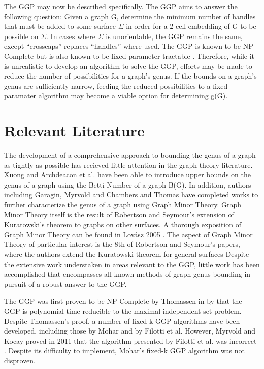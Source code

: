 \documentclass[12pt,conference]{IEEEtran}
\begin{document}
The GGP may now be described specifically. The GGP aims to answer the following question: Given a graph G, determine the minimum number of handles that must be added to some surface $\Sigma$ in order for a 2-cell embedding of G to be possible on $\Sigma$. In cases where $\Sigma$ is unorientable, the GGP remains the same, except ``crosscaps'' replaces ``handles'' where used. The GGP is known to be NP-Complete \cite{thomassen} but is also known to be fixed-parameter tractable \cite{mohar}. Therefore, while it is unrealistic to develop an algorithm to solve the GGP, efforts may be made to reduce the number of possibilities for a graph's genus. If the bounds on a graph's genus are sufficiently narrow, feeding the reduced possibilities to a fixed-paramater algorithm may become a viable option for determining g(G).

\section{Relevant Literature}

The development of a comprehensive approach to bounding the genus of a graph as tightly as possible has recieved little attention in the graph theory literature. Xuong \cite{xuong} and Archdeacon et al. \cite{archdeacon} have been able to introduce upper bounds on the genus of a graph using the Betti Number of a graph B(G). In addition, authors including Garagin, Myrvold and Chambers \cite{gagarin-myrvold} and Thomas \cite{thomas} have completed works to further characterize the genus of a graph using Graph Minor Theory. Graph Minor Theory itself is the result of Robertson and Seymour's extension of Kuratowski's theorem to graphs on other surfaces. A thorough exposition of Graph Minor Theory can be found in Lov\'asz 2005 \cite{lovasz}. The aspect of Graph Minor Theory of particular interest is the 8th of Robertson and Seymour's papers, where the authors extend the Kuratowski theorem for general surfaces \cite{graph-minors-8} Despite the extensive work understaken in areas relevant to the GGP, little work has been accomplished that encompasses all known methods of graph genus bounding in pursuit of a robust answer to the GGP. 

The GGP was first proven to be NP-Complete by Thomassen in \cite{thomassen} by that the GGP is polynomial time reducible to the maximal independent set problem. Despite Thomassen's proof, a number of fixed-k GGP algorithms have been developed, including those by Mohar \cite{mohar} and by Filotti et al. \cite{filotti} However, Myrvold and Kocay proved in 2011 that the algorithm presented by Filotti et al. was incorrect \cite{myrvold-kocay}. Despite its difficulty to implement, Mohar's fixed-k GGP algorithm was not disproven. 
\end{document}
